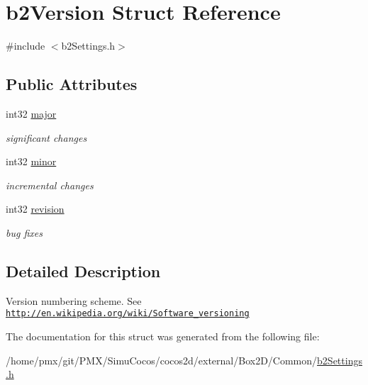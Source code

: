 \hypertarget{structb2Version}{}\section{b2\+Version Struct Reference}
\label{structb2Version}


{\ttfamily \#include $<$b2\+Settings.\+h$>$}

\subsection*{Public Attributes}
\begin{DoxyCompactItemize}
\item 
\mbox{\label{structb2Version_a720da8e346364d1cb34d176125380b44}} 
int32 \hyperlink{structb2Version_a720da8e346364d1cb34d176125380b44}{major}
\begin{DoxyCompactList}\small\item\em significant changes \end{DoxyCompactList}\item 
\mbox{\label{structb2Version_a115b8797a6e0b8e53f54502bd20d89da}} 
int32 \hyperlink{structb2Version_a115b8797a6e0b8e53f54502bd20d89da}{minor}
\begin{DoxyCompactList}\small\item\em incremental changes \end{DoxyCompactList}\item 
\mbox{\label{structb2Version_a395cfe1434e348115d2ead3d72b88847}} 
int32 \hyperlink{structb2Version_a395cfe1434e348115d2ead3d72b88847}{revision}
\begin{DoxyCompactList}\small\item\em bug fixes \end{DoxyCompactList}\end{DoxyCompactItemize}


\subsection{Detailed Description}
Version numbering scheme. See \href{http://en.wikipedia.org/wiki/Software_versioning}{\tt http\+://en.\+wikipedia.\+org/wiki/\+Software\+\_\+versioning} 

The documentation for this struct was generated from the following file\+:\begin{DoxyCompactItemize}
\item 
/home/pmx/git/\+P\+M\+X/\+Simu\+Cocos/cocos2d/external/\+Box2\+D/\+Common/\hyperlink{cocos2d_2external_2Box2D_2Common_2b2Settings_8h}{b2\+Settings.\+h}\end{DoxyCompactItemize}
